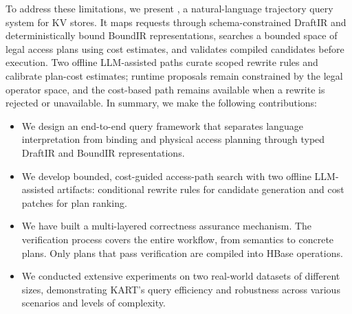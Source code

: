 To address these limitations, we present \KART{}, a natural-language trajectory query system for KV stores.
  It maps requests through schema-constrained DraftIR and deterministically bound BoundIR representations, searches a bounded space of legal access plans using cost estimates, and validates compiled candidates before execution.
  Two offline LLM-assisted paths curate scoped rewrite rules and calibrate plan-cost estimates; runtime proposals remain constrained by the legal operator space, and the cost-based path remains available when a rewrite is rejected or unavailable.
  In summary, we make the following contributions:

\begin{itemize}
\item We design an end-to-end query framework that separates language interpretation from binding and physical access planning through typed DraftIR and BoundIR representations.
\item We develop bounded, cost-guided access-path search with two offline LLM-assisted artifacts: conditional rewrite rules for candidate generation and cost patches for plan ranking.
\item We have built a multi-layered correctness assurance mechanism. The verification process covers the entire workflow, from semantics to concrete plans. Only plans that pass verification are compiled into HBase operations.
\item We conducted extensive experiments on two real-world datasets of different sizes, demonstrating KART's query efficiency and robustness across various scenarios and levels of complexity.
\end{itemize}
